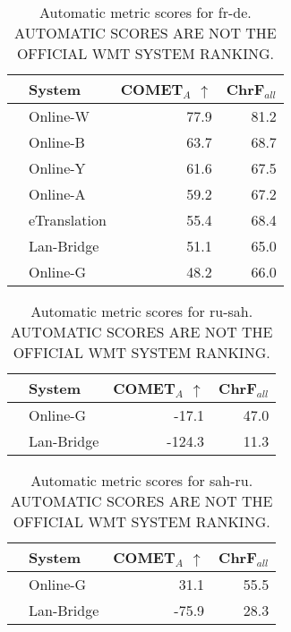 \begin{table}
\centering
\caption{Automatic metric scores for fr-de. \\AUTOMATIC SCORES ARE NOT THE OFFICIAL WMT SYSTEM RANKING.}
\begin{tabular}{llrr}
\toprule
          &        System &  COMET$_{A}$ $\uparrow$ &  ChrF$_{all}$ \\
\midrule
 \Uncon{} &      Online-W &                    77.9 &          81.2 \\
 \Uncon{} &      Online-B &                    63.7 &          68.7 \\
 \Uncon{} &      Online-Y &                    61.6 &          67.5 \\
 \Uncon{} &      Online-A &                    59.2 &          67.2 \\
 \Const{} &  eTranslation &                    55.4 &          68.4 \\
 \Uncon{} &    Lan-Bridge &                    51.1 &          65.0 \\
 \Uncon{} &      Online-G &                    48.2 &          66.0 \\
\bottomrule
\end{tabular}
\end{table}



\begin{table}
\centering
\caption{Automatic metric scores for ru-sah. \\AUTOMATIC SCORES ARE NOT THE OFFICIAL WMT SYSTEM RANKING.}
\begin{tabular}{llrr}
\toprule
          &      System &  COMET$_{A}$ $\uparrow$ &  ChrF$_{all}$ \\
\midrule
 \Uncon{} &    Online-G &                   -17.1 &          47.0 \\
 \Const{} &  Lan-Bridge &                  -124.3 &          11.3 \\
\bottomrule
\end{tabular}
\end{table}



\begin{table}
\centering
\caption{Automatic metric scores for sah-ru. \\AUTOMATIC SCORES ARE NOT THE OFFICIAL WMT SYSTEM RANKING.}
\begin{tabular}{llrr}
\toprule
          &      System &  COMET$_{A}$ $\uparrow$ &  ChrF$_{all}$ \\
\midrule
 \Uncon{} &    Online-G &                    31.1 &          55.5 \\
 \Const{} &  Lan-Bridge &                   -75.9 &          28.3 \\
\bottomrule
\end{tabular}
\end{table}



